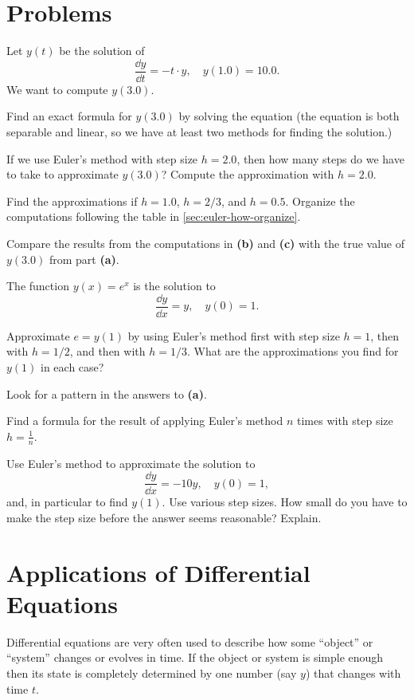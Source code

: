 \section{Problems} %
\problemfont %
\begin{multicols}{2}


\problem Let  $y(t)$ be the solution of %
\[
  \frac{\dd y}{\dd t} = -t\cdot y, \quad y(1.0) = 10.0.
\]
We want to compute $y(3.0)$.

\subprob Find an exact formula for $y(3.0)$ by solving the equation (the equation is
both separable and linear, so we have at least two methods for finding the solution.)

\subprob If we use Euler's method with step size $h=2.0$, then how many steps do we
have to take to approximate $y(3.0)$?  Compute the approximation with $h=2.0$.

\subprob Find the approximations if $h=1.0$, $h=2/3$, and $h=0.5$.  Organize the
computations following the table in \ref{sec:euler-how-organize}.

\subprob Compare the results from the computations in \textbf{(b)} and \textbf{(c)}
with the true value of $y(3.0)$ from part \textbf{(a)}.

\problem \carefulnow  The function $y(x) = e^x$ is the solution to %
\[
  \frac{\dd y}{\dd x} = y, \quad y(0) = 1.
\]

\subprob Approximate $e=y(1)$ by using Euler's method first with step size $h=1$,
then with $h=1/2$, and then with $h=1/3$.  What are the approximations you find for
$y(1)$ in each case?

\subprob Look for a pattern in the answers to \textbf{(a)}.

\subprob Find a formula for the result of applying Euler's method $n$ times with
step size $h=\frac1n$. 

\problem Use Euler's method to approximate the solution to %
\[
\frac{\dd y} {\dd x} = -10 y,\quad y(0) = 1,
\]
and, in particular to find $y(1)$.  Use various step sizes.  How small do you have to
make the step size before the answer seems reasonable?  Explain.


\end{multicols}
\noproblemfont
\section{Applications of Differential Equations} %
\label{sec:diffeq-applications}
Differential equations are very often used to describe how some ``object'' or
``system'' changes or evolves in time.  If the object or system is simple enough then
its state is completely determined by one number (say $y$) that changes with time
$t$.

